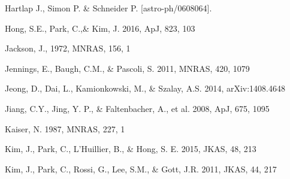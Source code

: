 \documentclass[iop]{emulateapj}
\begin{document}
\begin{thebibliography}{}







Hartlap J., Simon P. \& Schneider P. [astro-ph/0608064].


Hong, S.E., Park, C.,\&  Kim, J. 2016, ApJ, 823, 103

Jackson, J., 1972, MNRAS, 156, 1

Jennings, E., Baugh, C.M., \& Pascoli, S. 2011, MNRAS, 420, 1079  

Jeong, D., Dai, L., Kamionkowski, M., \& Szalay, A.S. 2014, arXiv:1408.4648

Jiang, C.Y., Jing, Y. P., \& Faltenbacher, A., et al. 2008, ApJ, 675, 1095

Kaiser, N. 1987, MNRAS, 227, 1




Kim, J., Park, C., L'Huillier, B., \& Hong, S. E. 2015, JKAS, 48, 213

Kim, J., Park, C., Rossi, G., Lee, S.M., \& Gott, J.R. 2011, JKAS, 44, 217  



\end{thebibliography}
\end{document}
